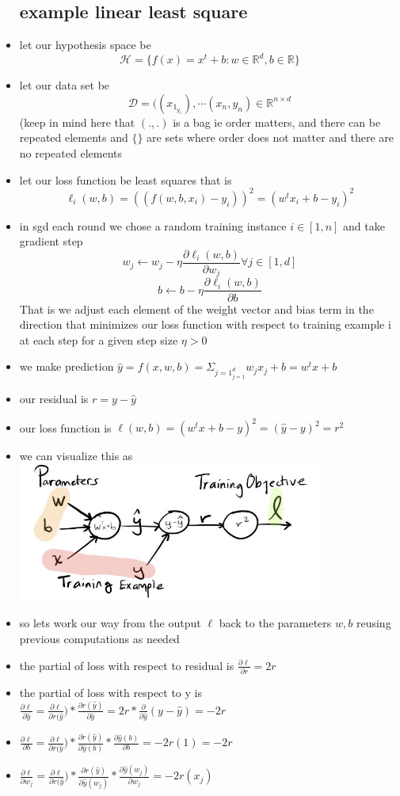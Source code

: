 \documentclass{article}
\begin{document}
\begin{itemize}
\subsection{example linear least square}
\item let our hypothesis space be $$\mathcal{H}=\{f(x)=x^t+b:w\in \mathbb{R}^d, b\in \mathbb{R}\}$$
\item let our data set be $$\mathcal{D}=((x_1_y_1), \cdots (x_n,y_n)\in \mathbb{R}^{n\times d}$$ (keep in mind here that $(. , .  )$ is a bag ie order matters, and there can be repeated elements and $\{\}$ are sets where order does not matter and there are no repeated elements
\item let our loss function be least squares that is $$\ell_i(w,b)=((f(w, b, x_i)- y_i))^2=(w^tx_i+b- y_i)^2$$
\item in sgd each round we chose a random training instance $i\in [1,n]$ and take gradient step $$w_j\leftarrow w_j-\eta \frac{\partial \ell_{i}(w,b)}{\partial w_j} \forall j\in [1,d]$$ $$b\leftarrow b- \eta \frac{\partial \ell_i(w,b)}{\partial b}$$ That is we adjust each element of the weight vector and bias term in the direction that minimizes our loss function with respect to training example i at each step for a given step size $\eta > 0$
\item  we make prediction $\hat{y}=f(x,w,b)=\Sigma_{j=1}_{j=1}^{d}w_jx_j+b=w^tx+b$
\item our residual is $r=y-\hat{y}$
\item our loss function is $\ell(w,b)=(w^tx+b-y)^2=(\hat{y}-y)^2=r^2$
\item we can visualize this as \\ \includegraphics[width=10cm]{lecture_notes/lecture_11/immages/l11_13.JPG}
\item so lets work our way from the output $\ell$ back to the parameters $w,b$ reusing previous computations as needed 
\item the partial of loss with respect to residual is $\frac{\partial \ell}{\partial r}=2r$
\item the partial of loss with respect to y is $\frac{\partial \ell}{\partial \hat{y}}=\frac{\partial \ell}{\partial r(\hat{y}})*\frac{\partial r(\hat{y})}{\partial \hat{y}}=2r*\frac{\partial }{\partial \hat{y}} (y-\hat{y})=-2r$
\item $\frac{\partial \ell }{\partial b}=\frac{\partial \ell}{\partial r(\hat{y}})*\frac{\partial r(\hat{y})}{\partial \hat{y}(b)}* \frac{\partial \hat{y}(b)}{\partial b}=-2r(1)=-2r$
\item $\frac{\partial \ell }{\partial w_j}=\frac{\partial \ell}{\partial r(\hat{y}})*\frac{\partial r(\hat{y})}{\partial \hat{y}(w_j)}* \frac{\partial \hat{y}(w_j)}{\partial w_j}=-2r(x_j)$

\end{itemize}
\end{document}
